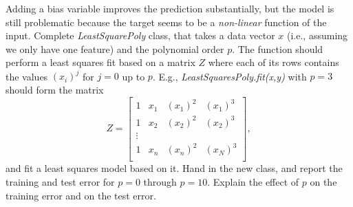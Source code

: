\documentclass{article}
\def\blu#1{{\color{blu}#1}}
\begin{document}
Adding a bias variable improves the prediction substantially, but the model is still problematic because the target seems to be a \emph{non-linear} function of the input.
Complete \emph{LeastSquarePoly} class, that takes a data vector $x$ (i.e., assuming we only have one feature) and the polynomial order $p$. The function should perform a least squares fit based on a matrix $Z$ where each of its rows contains the values $(x_{i})^j$ for $j=0$ up to $p$. E.g., \emph{LeastSquaresPoly.fit(x,y)}  with $p = 3$ should form the matrix
\[
Z =
\left[\begin{array}{cccc}
1 & x_1 & (x_1)^2 & (x_1)^3\\
1 & x_2 & (x_2)^2 & (x_2)^3\\
\vdots\\
1 & x_n & (x_n)^2 & (x_N)^3\\
\end{array}
\right],
\]
and fit a least squares model based on it.
\blu{Hand in the new class, and report the training and test error for $p = 0$ through $p= 10$. Explain the effect of $p$ on the training error and on the test error.}
\end{document}
